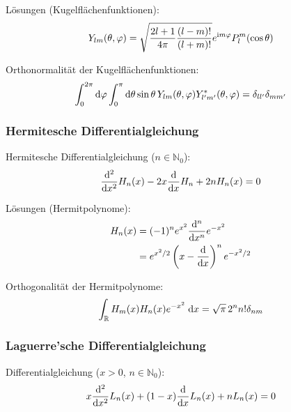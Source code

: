 \documentclass[11pt]{article}
\numberwithin{equation}{section}
\begin{document}
				\noindent
				Lösungen (Kugelflächenfunktionen):
				\begin{equation} \label{eq:kugelflächenfunktionen}
					Y_{lm}(\theta,\varphi) = \sqrt{\frac{2l+1}{4\pi}\frac{(l-m)!}{(l+m)!}} e^{\mathrm{i} m\varphi} P_l^m(\cos\theta)
				\end{equation}

				\noindent
				Orthonormalität der Kugelflächenfunktionen:
				\begin{equation}
					\int_0^{2\pi}\mathrm{d}\varphi \int_0^{\pi}\mathrm{d}\theta \sin\theta\, Y_{lm}(\theta,\varphi) Y^{*}_{l'm'}(\theta,\varphi) = 	\delta_{ll'}\delta_{mm'}
				\end{equation}

			\subsubsection{Hermitesche Differentialgleichung}
				\noindent
				Hermitesche Differentialgleichung ($n\in\mathbb{N}_0$):
				\begin{equation}
					\frac{\mathrm{d}^2}{\mathrm{d} x^2} H_n(x) -2x\frac{\mathrm{d} }{\mathrm{d} x} H_n+2 n H_n(x)=0
				\end{equation}

				\noindent
				Lösungen (Hermitpolynome):
				\begin{equation} \label{eq:Hermitpolynome}
					\begin{aligned}
						H_n(x) &= (-1)^n e^{x^2} \frac{\mathrm{d}^n}{\mathrm{d} x^n}e^{-x^2} \\
						&= e^{x^2/2}\left(x-\frac{\mathrm{d} }{\mathrm{d} x}\right)^n e^{-x^2/2} \\
					\end{aligned}
				\end{equation}

				\noindent
				Orthogonalität der Hermitpolynome:
				\begin{equation}
					\int_{\mathbb{R}} H_m(x) H_n(x) e^{-x^2}\;\mathrm{d} x = \sqrt{\pi}\,2^n n!\delta_{nm}
				\end{equation}

			\subsubsection{Laguerre'sche Differentialgleichung}
				\noindent
				Differentialgleichung ($x>0$, $n\in\mathbb{N}_0$):
				\begin{equation}
					x\frac{\mathrm{d}^2}{\mathrm{d} x^2}L_n(x) +(1-x)\frac{\mathrm{d} }{\mathrm{d} x}L_n(x) + nL_n(x) = 0
				\end{equation}
\end{document}
